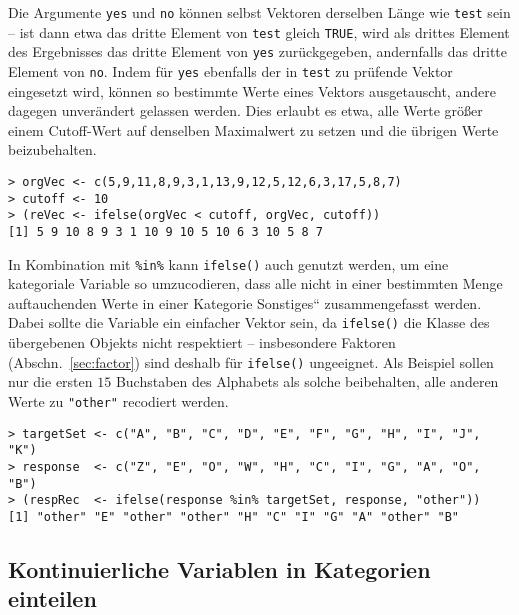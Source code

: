 Die Argumente \lstinline!yes! und \lstinline!no! können selbst Vektoren derselben Länge wie \lstinline!test! sein -- ist dann etwa das dritte Element von \lstinline!test! gleich \lstinline!TRUE!, wird als drittes Element des Ergebnisses das dritte Element von \lstinline!yes! zurückgegeben, andernfalls das dritte Element von \lstinline!no!. Indem für \lstinline!yes! ebenfalls der in \lstinline!test! zu prüfende Vektor eingesetzt wird, können so bestimmte Werte eines Vektors ausgetauscht, andere dagegen unverändert gelassen werden. Dies erlaubt es etwa, alle Werte größer einem Cutoff-Wert auf denselben Maximalwert zu setzen und die übrigen Werte beizubehalten.
\begin{lstlisting}
> orgVec <- c(5,9,11,8,9,3,1,13,9,12,5,12,6,3,17,5,8,7)
> cutoff <- 10
> (reVec <- ifelse(orgVec < cutoff, orgVec, cutoff))
[1] 5 9 10 8 9 3 1 10 9 10 5 10 6 3 10 5 8 7
\end{lstlisting}

In Kombination mit \lstinline!%in%! kann \lstinline!ifelse()! auch genutzt werden, um eine kategoriale Variable so umzucodieren, dass alle nicht in einer bestimmten Menge auftauchenden Werte in einer Kategorie {\quotedblbase}Sonstiges{\textquotedblleft} zusammengefasst werden. Dabei sollte die Variable ein einfacher Vektor sein, da \lstinline!ifelse()! die Klasse des übergebenen Objekts nicht respektiert -- insbesondere Faktoren (Abschn.\ \ref{sec:factor}) sind deshalb für \lstinline!ifelse()! ungeeignet. Als Beispiel sollen nur die ersten $15$ Buchstaben des Alphabets als solche beibehalten, alle anderen Werte zu \lstinline!"other"! recodiert werden.
\begin{lstlisting}
> targetSet <- c("A", "B", "C", "D", "E", "F", "G", "H", "I", "J", "K")
> response  <- c("Z", "E", "O", "W", "H", "C", "I", "G", "A", "O", "B")
> (respRec  <- ifelse(response %in% targetSet, response, "other"))
[1] "other" "E" "other" "other" "H" "C" "I" "G" "A" "other" "B"
\end{lstlisting}

\subsection{Kontinuierliche Variablen in Kategorien einteilen}
\label{sec:discretize}

